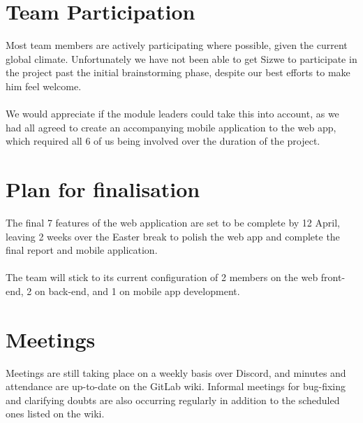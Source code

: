 \documentclass[11pt]{article}
\begin{document}
		\section{Team Participation}
		\hspace*{1em}Most team members are actively participating where possible, given the current global climate. Unfortunately we have not been able to get Sizwe to participate in the project past the initial brainstorming phase, despite our best efforts to make him feel welcome.
		\\
		\\
		\hspace*{1em}We would appreciate if the module leaders could take this into account, as we had all agreed to create an accompanying mobile application to the web app, which required all 6 of us being involved over the duration of the project.\\
		
		\section{Plan for finalisation}
		\hspace*{1em}The final 7 features of the web application are set to be complete by 12 April, leaving 2 weeks over the Easter break to polish the web app and complete the final report and mobile application.
		\\
		\\
		\hspace*{1em}The team will stick to its current configuration of 2 members on the web front-end, 2 on back-end, and 1 on mobile app development.\\
		
		\section{Meetings}
		\hspace*{1em}Meetings are still taking place on a weekly basis over Discord, and minutes and attendance are up-to-date on the GitLab wiki. Informal meetings for bug-fixing and clarifying doubts are also occurring regularly in addition to the scheduled ones listed on the wiki.
			
			
	
\end{document}
